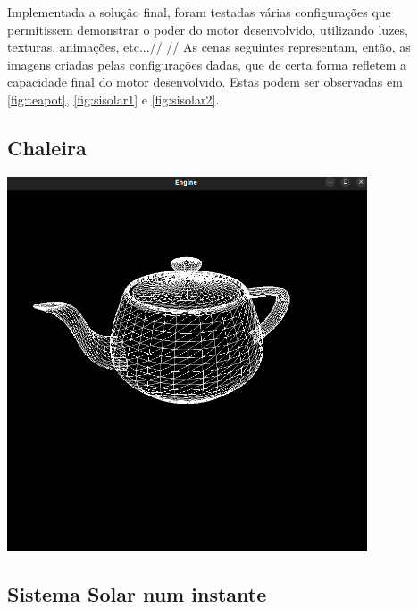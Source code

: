 Implementada a solução final, foram testadas várias configurações
que permitissem demonstrar o poder do motor desenvolvido,
utilizando luzes, texturas, animações, etc...//
//
As cenas seguintes representam, então, as imagens criadas pelas
configurações dadas, que de certa forma refletem a capacidade
final do motor desenvolvido. Estas podem ser observadas em
\ref{fig:teapot}, \ref{fig:sisolar1} e \ref{fig:sisolar2}.

\subsection{Chaleira}

\begin{center}
    \includegraphics[width=0.8\textwidth]{imgs/teapot.png}
    \label{fig:teapot}
\end{center}

\subsection{Sistema Solar num instante}

